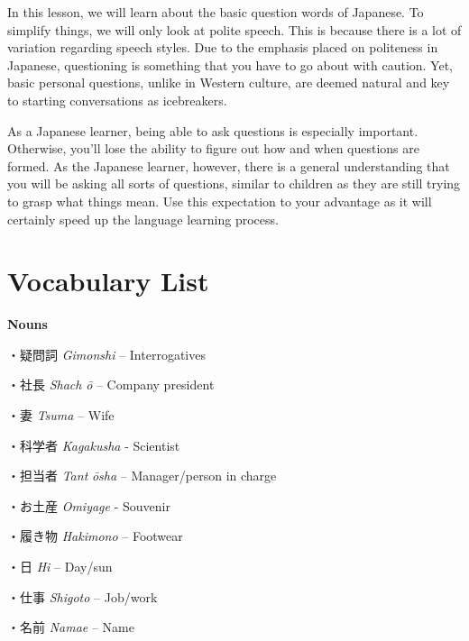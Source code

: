 \par{ In this lesson, we will learn about the basic question words of Japanese. To simplify things, we will only look at polite speech. This is because there is a lot of variation regarding speech styles. Due to the emphasis placed on politeness in Japanese, questioning is something that you have to go about with caution. Yet, basic personal questions, unlike in Western culture, are deemed natural and key to starting conversations as icebreakers. }

\par{ As a Japanese learner, being able to ask questions is especially important. Otherwise, you'll lose the ability to figure out how and when questions are formed. As the Japanese learner, however, there is a general understanding that you will be asking all sorts of questions, similar to children as they are still trying to grasp what things mean. Use this expectation to your advantage as it will certainly speed up the language learning process. }
      
\section{Vocabulary List}
 
\par{\textbf{Nouns }}

\par{・疑問詞 \emph{Gimonshi }– Interrogatives }

\par{・社長 \emph{Shach }\emph{ō }– Company president }

\par{・妻 \emph{Tsuma }– Wife }

\par{・科学者 \emph{Kagakusha }- Scientist }

\par{・担当者 \emph{Tant }\emph{ōsha }– Manager\slash person in charge }

\par{・お土産 \emph{Omiyage }- Souvenir }

\par{・履き物 \emph{Hakimono }– Footwear }

\par{・日 \emph{Hi }– Day\slash sun }

\par{・仕事 \emph{Shigoto }– Job\slash work }

\par{・名前 \emph{Namae }– Name }

